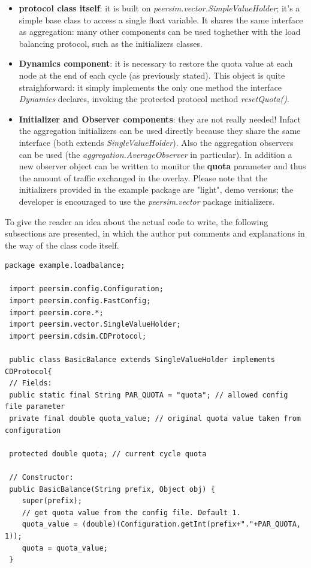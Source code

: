 \documentclass[a4paper,11pt]{article}
\begin{document}
\begin{itemize}
\item \textbf{protocol class itself}: it is built on \emph{peersim.vector.SimpleValueHolder};
it's a simple base class to access a single float variable. It shares the same
interface as aggregation: many other components can be used toghether
with the load balancing protocol, such as the initializers classes. 

\item \textbf{Dynamics component}: it is necessary to restore the quota value at
each node at the end of each cycle (as previously stated). This object
is quite straighforward: it simply implements the only one method
the interface \emph{Dynamics} declares, invoking the protected protocol
method \emph{resetQuota()}. 

\item \textbf{Initializer and Observer components}: they are not really needed!
Infact the aggregation initializers can be used directly because they share the 
same interface (both extends \emph{SingleValueHolder}). Also the aggregation
observers can be used (the \emph{aggregation.AverageObserver} in particular).
In addition a new observer object can be written to monitor the \textbf{quota}
parameter and thus the amount of traffic exchanged in the overlay.
Please note that the initializers provided in the example package are "light", demo
versions; the developer is encouraged to use the \emph{peersim.vector} package 
initializers.

\end{itemize}
To give the reader an idea about the actual code to write, the following
subsections are presented, in which the author put comments and explanations
in the way of the class code itself.

\footnotesize
\begin{verbatim}
package example.loadbalance;
 
 import peersim.config.Configuration;
 import peersim.config.FastConfig;
 import peersim.core.*;
 import peersim.vector.SingleValueHolder;
 import peersim.cdsim.CDProtocol;
 
 public class BasicBalance extends SingleValueHolder implements CDProtocol{
 // Fields:
 public static final String PAR_QUOTA = "quota"; // allowed config file parameter
 private final double quota_value; // original quota value taken from configuration
 
 protected double quota; // current cycle quota
 
 // Constructor:
 public BasicBalance(String prefix, Object obj) {
 	super(prefix);
  	// get quota value from the config file. Default 1.
 	quota_value = (double)(Configuration.getInt(prefix+"."+PAR_QUOTA, 1));
 	quota = quota_value;
 }
\end{verbatim}
\normalsize
\end{document}
